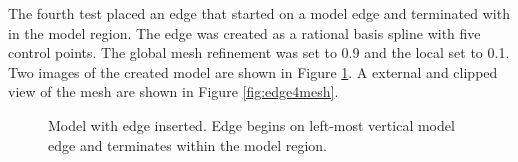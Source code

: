 \documentclass[a4paper, 12pt]{article}
\begin{document}
The fourth test placed an edge that started on a model edge and terminated 
with in the model region. 
The edge was created as a rational basis spline with five control points.
The global mesh refinement was set to 0.9 and the local set to 0.1. 
Two images of the created model are shown in Figure \ref{fig:edge4model}.
A external and clipped view of the mesh are shown in Figure \ref{fig:edge4mesh}.

\begin{figure}[H]
  \centering
  \caption{Model with edge inserted. Edge begins on left-most vertical model edge
        and terminates within the model region.}
  \label{fig:edge4model}
\end{figure}
\end{document}
